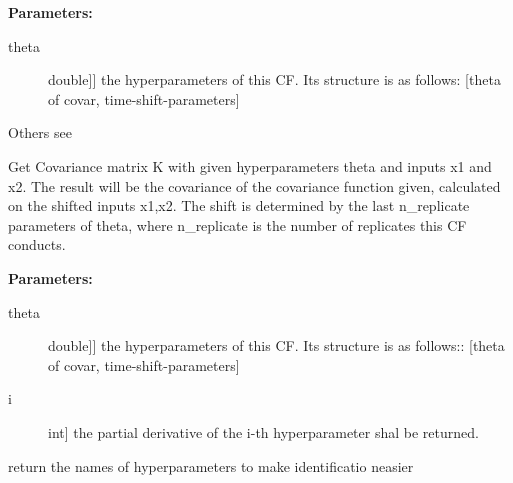 \documentclass[letterpaper,10pt,english]{sphinxmanual}
\begin{document}
\begin{fulllineitems}
\begin{fulllineitems}
\textbf{Parameters:}
\begin{description}
\item[{theta}] \leavevmode{[}{[}double{]}{]}
the hyperparameters of this CF. Its structure is as follows:
{[}theta of covar, time-shift-parameters{]}

\end{description}

Others see {\hyperref[covars:pygp.covar.CovarianceFunction]{}}

\end{fulllineitems}


\begin{fulllineitems}
\label{covars:pygp.covar.combinators.ShiftCF.Kgrad_theta}
Get Covariance matrix K with given hyperparameters
theta and inputs x1 and x2. The result
will be the covariance of the covariance
function given, calculated on the shifted inputs x1,x2.
The shift is determined by the last n\_replicate parameters of
theta, where n\_replicate is the number of replicates this
CF conducts.

\textbf{Parameters:}
\begin{description}
\item[{theta}] \leavevmode{[}{[}double{]}{]}
the hyperparameters of this CF. Its structure is as follows::
{[}theta of covar, time-shift-parameters{]}

\item[{i}] \leavevmode{[}int{]}
the partial derivative of the i-th
hyperparameter shal be returned.

\end{description}

\end{fulllineitems}


\begin{fulllineitems}
\label{covars:pygp.covar.combinators.ShiftCF.get_hyperparameter_names}
return the names of hyperparameters to make identificatio neasier

\end{fulllineitems}


\end{fulllineitems}
\end{document}
